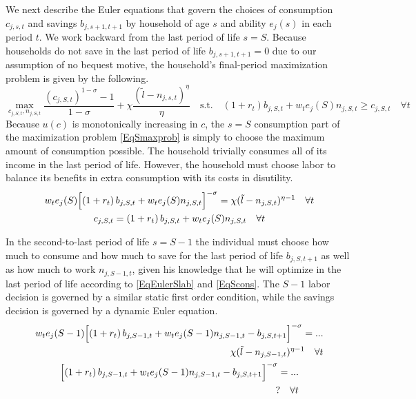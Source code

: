 \documentclass[letterpaper,12pt]{article}
\theoremstyle{definition}
\begin{document}
\begin{spacing}{1.5}
    We next describe the Euler equations that govern the choices of consumption $c_{j,s,t}$ and savings $b_{j,s+1,t+1}$ by household of age $s$ and ability $e_j(s)$ in each period $t$. We work backward from the last period of life $s = S$. Because households do not save in the last period of life $b_{j,s+1,t+1}=0$ due to our assumption of no bequest motive, the household's final-period maximization problem is given by the following.
    \begin{equation}\label{EqSmaxprob}
      \max_{c_{j,S,t},n_{j,S,t}} \frac{\left(c_{j,S,t}\right)^{1-\sigma} - 1}{1 - \sigma} + \chi\frac{(\tilde{l}-n_{j,s,t})^\eta}{\eta} \quad \text{s.t.} \quad \left(1+r_t\right)b_{j,S,t} + w_t e_j(S)n_{j,S,t} \geq c_{j,S,t} \quad \forall t
    \end{equation}
    Because $u(c)$ is monotonically increasing in $c$, the $s=S$ consumption part of the maximization problem \eqref{EqSmaxprob} is simply to choose the maximum amount of consumption possible. The household trivially consumes all of its income in the last period of life. However, the household must choose labor to balance its benefits in extra consumption with its costs in disutility.
    \begin{gather}
      w_t e_j(S)\Bigl[\left(1+r_t\right)b_{j,S,t} + w_t e_j(S)n_{j,S,t}\Bigr]^{-\sigma} = \chi(\tilde{l} - n_{j,S,t})^{\eta-1} \quad\forall t \label{EqEulerSlab} \\
      c_{j,S,t} = \left(1+r_t\right)b_{j,S,t} + w_t e_j(S)n_{j,S,t} \quad \forall t \label{EqScons}
    \end{gather}

    In the second-to-last period of life $s=S-1$ the individual must choose how much to consume and how much to save for the last period of life $b_{j,S,t+1}$ as well as how much to work $n_{j,S-1,t}$, given his knowledge that he will optimize in the last period of life according to \eqref{EqEulerSlab} and \eqref{EqScons}. The $S-1$ labor decision is governed by a similar static first order condition, while the savings decision is governed by a dynamic Euler equation.
    \begin{gather}
      \begin{split}
        w_t e_j(S-1)\Bigl[\left(1+r_t\right)b_{j,S-1,t} + w_t e_j(S-1)n_{j,S-1,t} - b_{j,S,t+1}\Bigr]^{-\sigma} = ... \\
        \chi(\tilde{l} - n_{j,S-1,t})^{\eta-1} \quad\forall t
      \end{split} \label{EqEulerSm1lab} \\
      \begin{split}
        \Bigl[\left(1+r_t\right)b_{j,S-1,t} + w_t e_j(S-1)n_{j,S-1,t} - b_{j,S,t+1}\Bigr]^{-\sigma} = ... \\
        ? \quad \forall t \label{EqEulerSm1Sav}
      \end{split}
    \end{gather}


\end{spacing}
\end{document}
